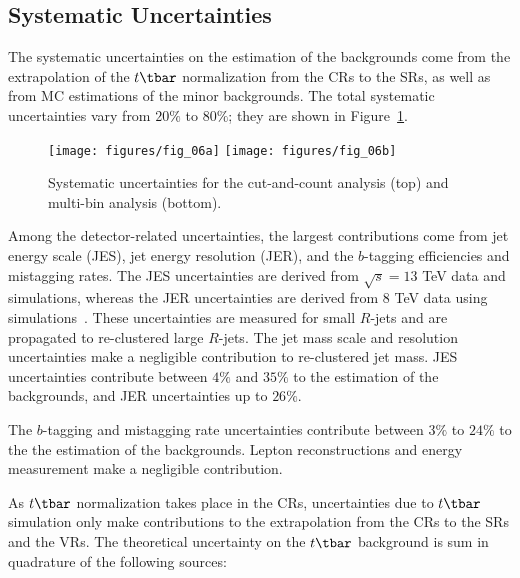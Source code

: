 \subsection{Systematic Uncertainties}\label{mb:sysun}

The systematic uncertainties on the estimation of the backgrounds come from the
extrapolation of the $t\tbar$ normalization from the CRs to the SRs, as well as
from MC estimations of the minor backgrounds. The total systematic
uncertainties vary from $20\%$ to $80\%$; they are shown in
Figure~\ref{f:fig_06}.

\begin{figure}[H]
	\texttt{[image: figures/fig\_06a]}
	\texttt{[image: figures/fig\_06b]}
	\centering
	\caption{Systematic uncertainties for the cut-and-count analysis (top) and multi-bin
		analysis (bottom).}
	\label{f:fig_06}
\end{figure}

Among the detector-related uncertainties, the largest contributions come from
jet energy scale (JES), jet energy resolution (JER), and the $b$-tagging
efficiencies and mistagging rates. The JES uncertainties are derived from
$\sqrt{s}=13$ TeV data and simulations, whereas the JER uncertainties are
derived from $8$ TeV data using simulations~\cite{ATL-PHYS-PUB-2015-015}. These
uncertainties are measured for small $R$-jets and are propagated to
re-clustered large $R$-jets. The jet mass scale and resolution uncertainties
make a negligible contribution to re-clustered jet mass. JES uncertainties
contribute between $4\%$ and $35\%$ to the estimation of the backgrounds, and
JER uncertainties up to $26\%$.

The $b$-tagging and mistagging rate uncertainties contribute between $3\%$ to
$24\%$ to the the estimation of the backgrounds. Lepton reconstructions and
energy measurement make a negligible contribution.

As $t\tbar$ normalization takes place in the CRs, uncertainties due to $t\tbar$
simulation only make contributions to the extrapolation from the CRs to the SRs
and the VRs. The theoretical uncertainty on the $t\tbar$ background is sum in
quadrature of the following sources:


